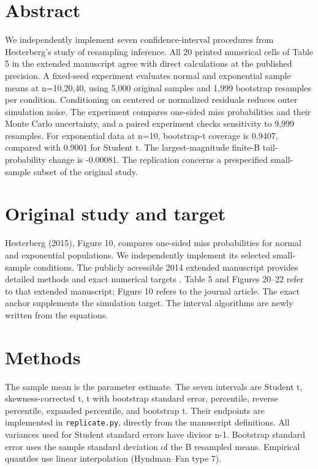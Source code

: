 \section*{Abstract}

We independently implement seven confidence-interval procedures from Hesterberg's study of resampling inference. All 20 printed numerical cells of Table 5 in the extended manuscript agree with direct calculations at the published precision. A fixed-seed experiment evaluates normal and exponential sample means at n=10,20,40, using 5,000 original samples and 1,999 bootstrap resamples per condition. Conditioning on centered or normalized residuals reduces outer simulation noise. The experiment compares one-sided miss probabilities and their Monte Carlo uncertainty, and a paired experiment checks sensitivity to 9,999 resamples. For exponential data at n=10, bootstrap-t coverage is 0.9407, compared with 0.9001 for Student t. The largest-magnitude finite-B tail-probability change is -0.00081. The replication concerns a prespecified small-sample subset of the original study.

\section{Original study and target}

Hesterberg (2015), Figure 10, compares one-sided miss probabilities for normal and exponential populations. We independently implement its selected small-sample conditions. The publicly accessible 2014 extended manuscript provides detailed methods and exact numerical targets \cite{hesterberg2014,hesterberg2015}. Table 5 and Figures 20–22 refer to that extended manuscript; Figure 10 refers to the journal article. The exact anchor supplements the simulation target. The interval algorithms are newly written from the equations.

\section{Methods}

The sample mean is the parameter estimate. The seven intervals are Student t, skewness-corrected t, t with bootstrap standard error, percentile, reverse percentile, expanded percentile, and bootstrap t. Their endpoints are implemented in \texttt{replicate.\allowbreak{}py}, directly from the manuscript definitions. All variances used for Student standard errors have divisor n-1. Bootstrap standard error uses the sample standard deviation of the B resampled means. Empirical quantiles use linear interpolation (Hyndman–Fan type 7).

